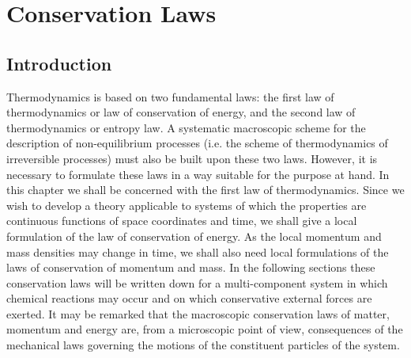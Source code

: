\chapter{Conservation Laws}

\section{Introduction}

Thermodynamics is based on two fundamental laws: the first law of
thermodynamics or law of conservation of energy, and the second law
of thermodynamics or entropy law. A systematic macroscopic scheme
for the description of non-equilibrium processes (i.e. the scheme of
thermodynamics of irreversible processes) must also be built upon these
two laws. However, it is necessary to formulate these laws in a way
suitable for the purpose at hand.
In this chapter we shall be concerned with the first law of thermodynamics.
Since we wish to develop a theory applicable to systems of
which the properties are continuous functions of space coordinates and
time, we shall give a local formulation of the law of conservation of
energy. As the local momentum and mass densities may change in time,
we shall also need local formulations of the laws of conservation of
momentum and mass.
In the following sections these conservation laws will be written
down for a multi-component system in which chemical reactions may
occur and on which conservative external forces are exerted.
It may be remarked that the macroscopic conservation laws of
matter, momentum and energy are, from a microscopic point of view,
consequences of the mechanical laws governing the motions of the
constituent particles of the system.

